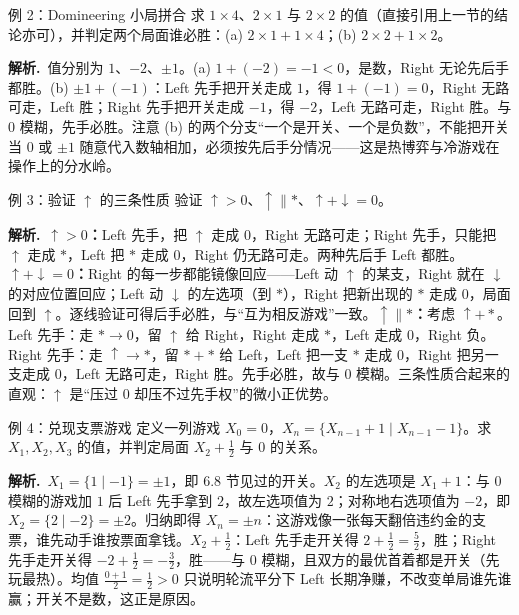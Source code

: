 \documentclass[UTF8,a4paper,11pt,oneside,openany,fontset=fandol]{ctexbook}
\theoremstyle{definition}
\newcommand{\sol}{\par\noindent\textbf{解析.}\ }
\begin{document}
\begin{problem}{例 2：Domineering 小局拼合}
求 $1\times4$、$2\times1$ 与 $2\times2$ 的值（直接引用上一节的结论亦可），并判定两个局面谁必胜：(a) $2\times1+1\times4$；(b) $2\times2+1\times2$。
\end{problem}

\sol 值分别为 $1$、$-2$、$\pm1$。(a) $1+(-2)=-1<0$，是数，Right 无论先后手都胜。(b) $\pm1+(-1)$：Left 先手把开关走成 $1$，得 $1+(-1)=0$，Right 无路可走，Left 胜；Right 先手把开关走成 $-1$，得 $-2$，Left 无路可走，Right 胜。与 $0$ 模糊，先手必胜。注意 (b) 的两个分支“一个是开关、一个是负数”，不能把开关当 $0$ 或 $\pm1$ 随意代入数轴相加，必须按先后手分情况——这是热博弈与冷游戏在操作上的分水岭。

\begin{problem}{例 3：验证 $\uparrow$ 的三条性质}
验证 $\uparrow>0$、$\uparrow\parallel\ast$、$\uparrow+\downarrow=0$。
\end{problem}

\sol \textbf{$\uparrow>0$：}Left 先手，把 $\uparrow$ 走成 $0$，Right 无路可走；Right 先手，只能把 $\uparrow$ 走成 $\ast$，Left 把 $\ast$ 走成 $0$，Right 仍无路可走。两种先后手 Left 都胜。\textbf{$\uparrow+\downarrow=0$：}Right 的每一步都能镜像回应——Left 动 $\uparrow$ 的某支，Right 就在 $\downarrow$ 的对应位置回应；Left 动 $\downarrow$ 的左选项（到 $\ast$），Right 把新出现的 $\ast$ 走成 $0$，局面回到 $\uparrow$。逐线验证可得后手必胜，与“互为相反游戏”一致。\textbf{$\uparrow\parallel\ast$：}考虑 $\uparrow+\ast$。Left 先手：走 $\ast\to0$，留 $\uparrow$ 给 Right，Right 走成 $\ast$，Left 走成 $0$，Right 负。Right 先手：走 $\uparrow\to\ast$，留 $\ast+\ast$ 给 Left，Left 把一支 $\ast$ 走成 $0$，Right 把另一支走成 $0$，Left 无路可走，Right 胜。先手必胜，故与 $0$ 模糊。三条性质合起来的直观：$\uparrow$ 是“压过 $0$ 却压不过先手权”的微小正优势。

\begin{problem}{例 4：兑现支票游戏}
定义一列游戏 $X_0=0$，$X_{n}=\{X_{n-1}+1\mid X_{n-1}-1\}$。求 $X_1,X_2,X_3$ 的值，并判定局面 $X_2+\tfrac12$ 与 $0$ 的关系。
\end{problem}

\sol $X_1=\{1\mid -1\}=\pm1$，即 6.8 节见过的开关。$X_2$ 的左选项是 $X_1+1$：与 $0$ 模糊的游戏加 $1$ 后 Left 先手拿到 $2$，故左选项值为 $2$；对称地右选项值为 $-2$，即 $X_2=\{2\mid -2\}=\pm2$。归纳即得 $X_n=\pm n$：这游戏像一张每天翻倍违约金的支票，谁先动手谁按票面拿钱。$X_2+\tfrac12$：Left 先手走开关得 $2+\tfrac12=\tfrac52$，胜；Right 先手走开关得 $-2+\tfrac12=-\tfrac32$，胜——与 $0$ 模糊，且双方的最优首着都是开关（先玩最热）。均值 $\tfrac{0+1}{2}=\tfrac12>0$ 只说明轮流平分下 Left 长期净赚，不改变单局谁先谁赢；开关不是数，这正是原因。
\end{document}
